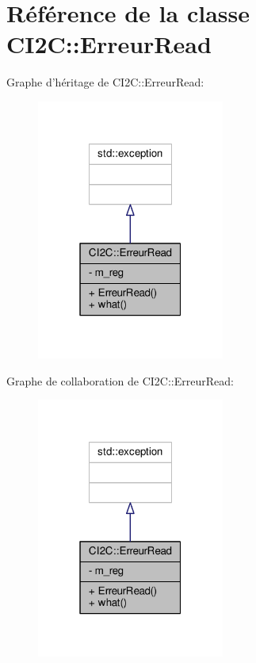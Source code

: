 \hypertarget{classCI2C_1_1ErreurRead}{\section{Référence de la classe C\+I2\+C\+:\+:Erreur\+Read}
\label{classCI2C_1_1ErreurRead}
}


Graphe d'héritage de C\+I2\+C\+:\+:Erreur\+Read\+:
\nopagebreak
\begin{figure}[H]
\begin{center}
\leavevmode
\includegraphics[width=175pt]{classCI2C_1_1ErreurRead__inherit__graph}
\end{center}
\end{figure}


Graphe de collaboration de C\+I2\+C\+:\+:Erreur\+Read\+:
\nopagebreak
\begin{figure}[H]
\begin{center}
\leavevmode
\includegraphics[width=175pt]{classCI2C_1_1ErreurRead__coll__graph}
\end{center}
\end{figure}
